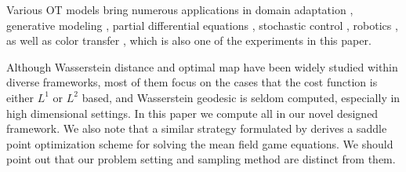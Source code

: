 \documentclass{article}
\begin{document}
Various OT models bring numerous applications in domain adaptation \citep{largeot}, generative modeling \citep{wgan}, partial differential equations \citep{learnsde1}, stochastic control \citep{wassercontrol}, robotics \citep{otrobotics1,otrobotics2}, as well as color transfer \citep{wasserstein2gan}, which is also one of the experiments in this paper.

Although Wasserstein distance and optimal map have been widely studied within diverse frameworks, most of them focus on the cases that the cost function is either $L^1$ or $L^2$ based, and Wasserstein geodesic is seldom computed, especially in high dimensional settings. In this paper we compute all in our novel designed framework. We also note that a similar strategy formulated by \citet{apac} derives a saddle point optimization scheme for solving the mean field game equations. We should point out that our problem setting and sampling method are distinct from them.
\end{document}
